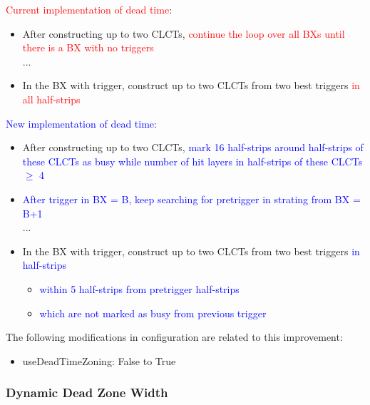 \textcolor{red}{Current implementation of dead time}:
\begin{itemize}
    \item After constructing up to two CLCTs, \textcolor{red}{continue the loop over all BXs until there is a BX with no triggers}
    \\...
    \item In the BX with trigger, construct up to two CLCTs from two best triggers \textcolor{red}{in all half-strips}
    
\end{itemize}
\textcolor{blue}{New implementation of dead time}:
\begin{itemize}
    \item After constructing up to two CLCTs, \textcolor{blue}{mark 16 half-strips around half-strips of these CLCTs as busy while number of hit layers in half-strips of these CLCTs $\geq$ 4}
    \item \textcolor{blue}{After trigger in BX = B, keep searching for pretrigger in strating from BX = B+1}
    \\...
    \item In the BX with trigger, construct up to two CLCTs from two best triggers \textcolor{blue}{in half-strips}
    \begin{itemize}
        \item \textcolor{blue}{within 5 half-strips from pretrigger half-strips}
        \item \textcolor{blue}{which are not marked as busy from previous trigger}
    \end{itemize}
\end{itemize}

The following modifications in configuration are related to this improvement:
\begin{itemize}
    \item useDeadTimeZoning: False to True
\end{itemize}

\subsubsection{Dynamic Dead Zone Width}

